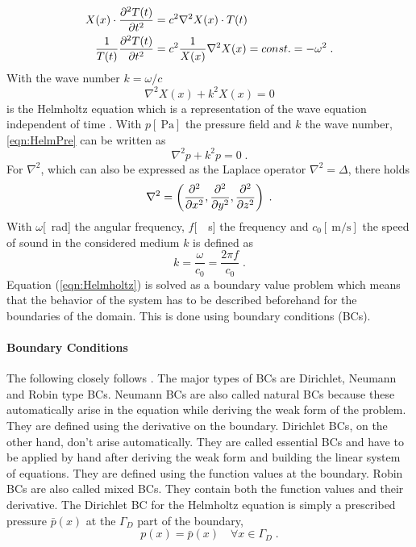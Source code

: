 \documentclass[%
  a4paper,oneside,%
  11pt,%
  smallchapters,
  style=printdev,
  extramargin,
  green,%
  rgb, <cmyk>
  ]{tubsbook}
\begin{document}
\begin{align}
X(x) \cdot \pdv[2]{T(t)}{t} &= c^2 \nabla^2 X(x) \cdot T(t)\\
\frac{1}{T(t)} \pdv[2]{T(t)}{t} &= c^2 \frac{1}{X(x)} \nabla^2 X(x) = const. = - \omega^2 \; .
\end{align}
With the wave number $k = \omega / c$ 
\begin{equation}
\nabla^2 X(x) + k^2 X(x) = 0
\label{eqn:HelmPre}
\end{equation}
is the Helmholtz equation which is a representation of the wave equation independent of time \cite[p. 1083 ff.]{arens2015}.
%
With $p [\SI{}{\pascal}]$ the pressure field and $k$ the wave number, \eqref{eqn:HelmPre} can be written as
\begin{equation}
\nabla^2 p + k^2 p = 0 \;.
\label{eqn:Helmholtz}
\end{equation}
For $\nabla^2$, which can also be expressed as the Laplace operator $\nabla^2 = \Delta$, there holds
\begin{equation}
\nabla^2 = \left( \pdv[2]{}{x},\pdv[2]{}{y},\pdv[2]{}{z} \right) \;.
\end{equation}
With $\omega$[\SI{}{\radian}] the angular frequency, $f$[\SI{}{\per\s}] the frequency and $c_0[\SI{}{\metre\per\s}]$ the speed of sound in the considered medium $k$ is defined as
\begin{equation}
k = \frac{\omega}{c_0} = \frac{2 \pi f}{c_0} \;.
\end{equation}
Equation (\ref{eqn:Helmholtz}) is solved as a boundary value problem which means that the behavior of the system has to be described beforehand for the boundaries of the domain. This is done using boundary conditions (BCs).



\paragraph{Boundary Conditions}
The following closely follows \cite{atalla2015}. The major types of BCs are Dirichlet, Neumann and Robin type BCs. Neumann BCs are also called natural BCs because these automatically arise in the equation while deriving the weak form of the problem. They are defined using the derivative on the boundary. Dirichlet BCs, on the other hand, don't arise automatically. They are called essential BCs and have to be applied by hand after deriving the weak form and building the linear system of equations. They are defined using the function values at the boundary. Robin BCs are also called mixed BCs. They contain both the function values and their derivative.
The Dirichlet BC for the Helmholtz equation is simply a prescribed pressure $\bar{p}(x)$ at the $\Gamma_D$ part of the boundary,
\begin{equation}
p(x) = \bar{p}(x) \quad \forall x \in \Gamma_D \;.
\end{equation}
\end{document}
